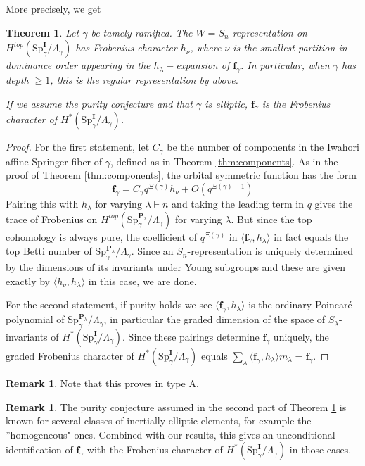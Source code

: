 \documentclass{amsart}
\numberwithin{equation}{section}
\newtheorem{theorem}[lemma]{Theorem}%
\theoremstyle{definition}
\newtheorem{remark}[lemma]{Remark}%
\def\Sp{{\mathrm{Sp}}}
\newcommand{\fgamma}{\mathbf{f}_{\gamma}}
\newcommand{\bP}{\mathbf{P}}
\newcommand{\bI}{\mathbf{I}}
\begin{document}
More precisely, we get 
\begin{theorem}
\label{thm:topdegreerep}
Let $\gamma$ be tamely ramified. The $W=S_n$-representation on $H^{top}(\Sp^\bI_\gamma/\Lambda_\gamma)$ has Frobenius character $h_\nu$, where $\nu$ is the smallest partition in dominance order appearing in the $h_\lambda-$expansion of $\fgamma$.
In particular, when $\gamma$ has depth $\geq 1$, this is the regular representation by above.

If we assume the purity conjecture and that $\gamma$ is elliptic, $\fgamma$ is the Frobenius character of $H^*(\Sp^\bI_\gamma/\Lambda_\gamma)$.
\end{theorem}
\begin{proof}
For the first statement, let $C_\gamma$ be the number of components in the Iwahori affine Springer fiber of $\gamma$, defined as in Theorem \ref{thm:components}. As in the proof of Theorem \ref{thm:components}, the orbital symmetric function has the form 
$$\fgamma=C_\gamma q^{\Xi(\gamma)} h_\nu+O(q^{\Xi(\gamma)-1})$$ Pairing this with $h_\lambda$ for varying $\lambda\vdash n$ and taking the leading term in $q$ gives the trace of Frobenius on $H^{top}(\Sp_\gamma^{\bP_\lambda}/\Lambda_\gamma)$ for varying $\lambda$. But since the top cohomology is always pure, the coefficient of $q^{\Xi(\gamma)}$ in $\langle \fgamma, h_\lambda\rangle$ in fact equals the top Betti number of $\Sp_\gamma^{\bP_\lambda}/\Lambda_\gamma$. Since an $S_n$-representation is uniquely determined by the dimensions of its invariants under Young subgroups and these are given exactly by $\langle h_\nu, h_\lambda\rangle$ in this case, we are done.

For the second statement, if purity holds we see $\langle \fgamma, h_\lambda\rangle$ is the ordinary Poincar\'e polynomial of $\Sp_\gamma^{\bP_\lambda}/\Lambda_\gamma$, in particular the graded dimension of the space of $S_\lambda$-invariants of $H^*(\Sp_\gamma^\bI/\Lambda_\gamma)$. Since these pairings determine $\fgamma$ uniquely, the graded Frobenius character of $H^*(\Sp_\gamma^\bI/\Lambda_\gamma)$ equals $\sum_\lambda \langle \fgamma,h_\lambda\rangle m_\lambda=\fgamma$.
\end{proof}
\begin{remark}
Note that this proves \cite[Conjecture 7.17.]{GKO} in type A.
\end{remark}

\begin{remark}
\label{rmk:purity}
The purity conjecture assumed in the second part of Theorem \ref{thm:topdegreerep} is known for several classes of inertially elliptic elements, for example the ''homogeneous" ones. Combined with our results, this gives an unconditional identification of $\fgamma$ with the Frobenius character of $H^*(\Sp^\bI_\gamma/\Lambda_\gamma)$ in those cases. 
\end{remark}
\end{document}
